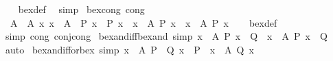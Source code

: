 \begin{isabellebody}
%
\isadelimproof
\ \ %
\endisadelimproof
%
\isatagproof
{}\isamarkupfalse%
\ bex{\isacharunderscore}{\kern0pt}def\ \isamarkupfalse%
\ simp%
\endisatagproof
{\isafoldproof}%
%
\isadelimproof
\isanewline
%
\endisadelimproof
\isanewline
{}\isamarkupfalse%
\ bex{\isacharunderscore}{\kern0pt}cong\ {\isacharbrackleft}{\kern0pt}cong{\isacharbrackright}{\kern0pt}{\isacharcolon}{\kern0pt}\isanewline
\ \ {\isachardoublequoteopen}{\isasymlbrakk}A\ {\isacharequal}{\kern0pt}\ A{\isacharprime}{\kern0pt}{\isacharsemicolon}{\kern0pt}\ {\isasymAnd}x{\isachardot}{\kern0pt}\ x\ {\isasymin}\ A{\isacharprime}{\kern0pt}\ {\isasymLongrightarrow}\ P\ x\ {\isasymlongleftrightarrow}\ P{\isacharprime}{\kern0pt}\ x{\isasymrbrakk}\ {\isasymLongrightarrow}\ {\isacharparenleft}{\kern0pt}{\isasymexists}x\ {\isasymin}\ A{\isachardot}{\kern0pt}\ P\ x{\isacharparenright}{\kern0pt}\ {\isasymlongleftrightarrow}\ {\isacharparenleft}{\kern0pt}{\isasymexists}x\ {\isasymin}\ A{\isacharprime}{\kern0pt}{\isachardot}{\kern0pt}\ P{\isacharprime}{\kern0pt}\ x{\isacharparenright}{\kern0pt}{\isachardoublequoteclose}\isanewline
%
\isadelimproof
\ \ %
\endisadelimproof
%
\isatagproof
{}\isamarkupfalse%
\ bex{\isacharunderscore}{\kern0pt}def\ \isamarkupfalse%
\ {\isacharparenleft}{\kern0pt}simp\ cong{\isacharcolon}{\kern0pt}\ conj{\isacharunderscore}{\kern0pt}cong{\isacharparenright}{\kern0pt}%
\endisatagproof
{\isafoldproof}%
%
\isadelimproof
\isanewline
%
\endisadelimproof
\isanewline
{}\isamarkupfalse%
\ bex{\isacharunderscore}{\kern0pt}and{\isacharunderscore}{\kern0pt}iff{\isacharunderscore}{\kern0pt}bex{\isacharunderscore}{\kern0pt}and\ {\isacharbrackleft}{\kern0pt}simp{\isacharbrackright}{\kern0pt}{\isacharcolon}{\kern0pt}\ {\isachardoublequoteopen}{\isacharparenleft}{\kern0pt}{\isasymexists}x\ {\isasymin}\ A{\isachardot}{\kern0pt}\ P\ x\ {\isasymand}\ Q{\isacharparenright}{\kern0pt}\ {\isasymlongleftrightarrow}\ {\isacharparenleft}{\kern0pt}{\isacharparenleft}{\kern0pt}{\isasymexists}x\ {\isasymin}\ A{\isachardot}{\kern0pt}\ P\ x{\isacharparenright}{\kern0pt}\ {\isasymand}\ Q{\isacharparenright}{\kern0pt}{\isachardoublequoteclose}\isanewline
%
\isadelimproof
\ \ %
\endisadelimproof
%
\isatagproof
{}\isamarkupfalse%
\ auto%
\endisatagproof
{\isafoldproof}%
%
\isadelimproof
\isanewline
%
\endisadelimproof
\isanewline
{}\isamarkupfalse%
\ bex{\isacharunderscore}{\kern0pt}and{\isacharunderscore}{\kern0pt}iff{\isacharunderscore}{\kern0pt}or{\isacharunderscore}{\kern0pt}bex\ {\isacharbrackleft}{\kern0pt}simp{\isacharbrackright}{\kern0pt}{\isacharcolon}{\kern0pt}\ {\isachardoublequoteopen}{\isacharparenleft}{\kern0pt}{\isasymexists}x\ {\isasymin}\ A{\isachardot}{\kern0pt}\ P\ {\isasymand}\ Q\ x{\isacharparenright}{\kern0pt}\ {\isasymlongleftrightarrow}\ {\isacharparenleft}{\kern0pt}P\ {\isasymand}\ {\isacharparenleft}{\kern0pt}{\isasymexists}x\ {\isasymin}\ A{\isachardot}{\kern0pt}\ Q\ x{\isacharparenright}{\kern0pt}{\isacharparenright}{\kern0pt}{\isachardoublequoteclose}\isanewline

\end{isabellebody}
